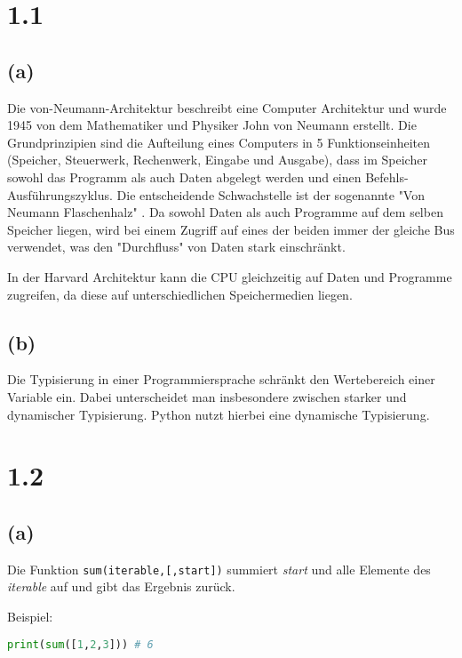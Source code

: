 \section*{1.1}
\subsection*{(a)}
Die von-Neumann-Architektur beschreibt eine Computer Architektur und wurde 1945 von dem Mathematiker und Physiker John
von Neumann erstellt.
Die Grundprinzipien sind die Aufteilung eines Computers in 5 Funktionseinheiten (Speicher, Steuerwerk, Rechenwerk, Eingabe und Ausgabe),
dass im Speicher sowohl das Programm als auch Daten abgelegt werden und einen Befehls-Ausführungszyklus.\cite{skript}
Die entscheidende Schwachstelle ist der sogenannte "Von Neumann Flaschenhalz" \cite{vNA-Wikipedia}.
Da sowohl Daten als auch Programme auf dem selben Speicher liegen, wird bei einem Zugriff auf eines der beiden immer der gleiche
Bus verwendet, was den "Durchfluss" von Daten stark einschränkt.

In der Harvard Architektur kann die CPU gleichzeitig auf Daten und Programme zugreifen, da diese auf unterschiedlichen
Speichermedien liegen. \cite{hA-Wikipedia}

\subsection*{(b)}
Die Typisierung in einer Programmiersprache schränkt den Wertebereich einer Variable ein.
Dabei unterscheidet man insbesondere zwischen starker und dynamischer Typisierung. \cite{typisierung-Wikipedia}
Python nutzt hierbei eine dynamische Typisierung.

\section*{1.2}
\subsection*{(a)}
Die Funktion \verb+sum(iterable,[,start])+ summiert \textit{start} und alle Elemente des \textit{iterable} auf und gibt
das Ergebnis zurück. \cite{python-docs}

Beispiel:
\begin{lstlisting}[language=Python]
print(sum([1,2,3])) # 6
\end{lstlisting}


